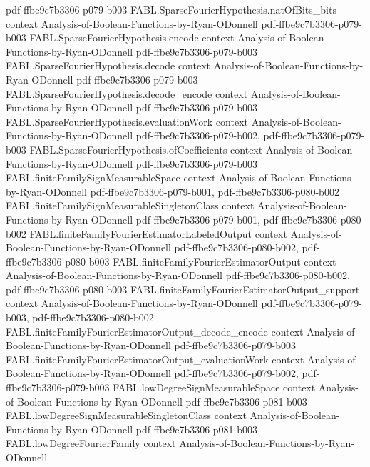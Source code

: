 \begin{theorem}
  {pdf-ffbe9c7b3306-p079-b003}
\proofstep
  {FABL.SparseFourierHypothesis.natOfBits_bits}
  {context}
  {Analysis-of-Boolean-Functions-by-Ryan-ODonnell}
  {pdf-ffbe9c7b3306-p079-b003}
\proofstep
  {FABL.SparseFourierHypothesis.encode}
  {context}
  {Analysis-of-Boolean-Functions-by-Ryan-ODonnell}
  {pdf-ffbe9c7b3306-p079-b003}
\proofstep
  {FABL.SparseFourierHypothesis.decode}
  {context}
  {Analysis-of-Boolean-Functions-by-Ryan-ODonnell}
  {pdf-ffbe9c7b3306-p079-b003}
\proofstep
  {FABL.SparseFourierHypothesis.decode_encode}
  {context}
  {Analysis-of-Boolean-Functions-by-Ryan-ODonnell}
  {pdf-ffbe9c7b3306-p079-b003}
\proofstep
  {FABL.SparseFourierHypothesis.evaluationWork}
  {context}
  {Analysis-of-Boolean-Functions-by-Ryan-ODonnell}
  {pdf-ffbe9c7b3306-p079-b002,
    pdf-ffbe9c7b3306-p079-b003}
\proofstep
  {FABL.SparseFourierHypothesis.ofCoefficients}
  {context}
  {Analysis-of-Boolean-Functions-by-Ryan-ODonnell}
  {pdf-ffbe9c7b3306-p079-b003}
\proofstep
  {FABL.finiteFamilySignMeasurableSpace}
  {context}
  {Analysis-of-Boolean-Functions-by-Ryan-ODonnell}
  {pdf-ffbe9c7b3306-p079-b001,
    pdf-ffbe9c7b3306-p080-b002}
\proofstep
  {FABL.finiteFamilySignMeasurableSingletonClass}
  {context}
  {Analysis-of-Boolean-Functions-by-Ryan-ODonnell}
  {pdf-ffbe9c7b3306-p079-b001,
    pdf-ffbe9c7b3306-p080-b002}
\proofstep
  {FABL.finiteFamilyFourierEstimatorLabeledOutput}
  {context}
  {Analysis-of-Boolean-Functions-by-Ryan-ODonnell}
  {pdf-ffbe9c7b3306-p080-b002,
    pdf-ffbe9c7b3306-p080-b003}
\proofstep
  {FABL.finiteFamilyFourierEstimatorOutput}
  {context}
  {Analysis-of-Boolean-Functions-by-Ryan-ODonnell}
  {pdf-ffbe9c7b3306-p080-b002,
    pdf-ffbe9c7b3306-p080-b003}
\proofstep
  {FABL.finiteFamilyFourierEstimatorOutput_support}
  {context}
  {Analysis-of-Boolean-Functions-by-Ryan-ODonnell}
  {pdf-ffbe9c7b3306-p079-b003,
    pdf-ffbe9c7b3306-p080-b002}
\proofstep
  {FABL.finiteFamilyFourierEstimatorOutput_decode_encode}
  {context}
  {Analysis-of-Boolean-Functions-by-Ryan-ODonnell}
  {pdf-ffbe9c7b3306-p079-b003}
\proofstep
  {FABL.finiteFamilyFourierEstimatorOutput_evaluationWork}
  {context}
  {Analysis-of-Boolean-Functions-by-Ryan-ODonnell}
  {pdf-ffbe9c7b3306-p079-b002,
    pdf-ffbe9c7b3306-p079-b003}
\proofstep
  {FABL.lowDegreeSignMeasurableSpace}
  {context}
  {Analysis-of-Boolean-Functions-by-Ryan-ODonnell}
  {pdf-ffbe9c7b3306-p081-b003}
\proofstep
  {FABL.lowDegreeSignMeasurableSingletonClass}
  {context}
  {Analysis-of-Boolean-Functions-by-Ryan-ODonnell}
  {pdf-ffbe9c7b3306-p081-b003}
\proofstep
  {FABL.lowDegreeFourierFamily}
  {context}
  {Analysis-of-Boolean-Functions-by-Ryan-ODonnell}

\end{theorem}
